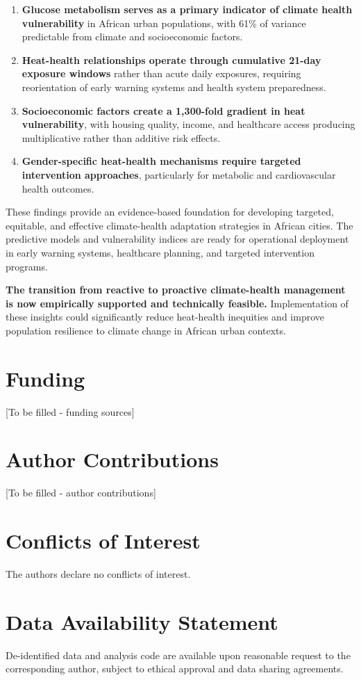 \documentclass[11pt,a4paper]{article}
\begin{document}
\begin{enumerate}
\item \textbf{Glucose metabolism serves as a primary indicator of climate health vulnerability} in African urban populations, with 61\% of variance predictable from climate and socioeconomic factors.

\item \textbf{Heat-health relationships operate through cumulative 21-day exposure windows} rather than acute daily exposures, requiring reorientation of early warning systems and health system preparedness.

\item \textbf{Socioeconomic factors create a 1,300-fold gradient in heat vulnerability}, with housing quality, income, and healthcare access producing multiplicative rather than additive risk effects.

\item \textbf{Gender-specific heat-health mechanisms require targeted intervention approaches}, particularly for metabolic and cardiovascular health outcomes.
\end{enumerate}

These findings provide an evidence-based foundation for developing targeted, equitable, and effective climate-health adaptation strategies in African cities. The predictive models and vulnerability indices are ready for operational deployment in early warning systems, healthcare planning, and targeted intervention programs.

\textbf{The transition from reactive to proactive climate-health management is now empirically supported and technically feasible.} Implementation of these insights could significantly reduce heat-health inequities and improve population resilience to climate change in African urban contexts.

\section*{Funding}

[To be filled - funding sources]

\section*{Author Contributions}

[To be filled - author contributions]

\section*{Conflicts of Interest}

The authors declare no conflicts of interest.

\section*{Data Availability Statement}

De-identified data and analysis code are available upon reasonable request to the corresponding author, subject to ethical approval and data sharing agreements.


\end{document}
